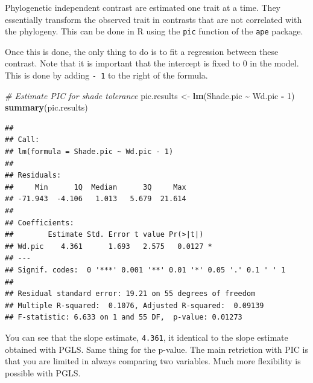 \documentclass[
]{book}
\newenvironment{Shaded}{\begin{snugshade}}{\end{snugshade}}
\newcommand{\AttributeTok}[1]{\textcolor[rgb]{0.13,0.29,0.53}{#1}}
\newcommand{\CommentTok}[1]{\textcolor[rgb]{0.56,0.35,0.01}{\textit{#1}}}
\newcommand{\DecValTok}[1]{\textcolor[rgb]{0.00,0.00,0.81}{#1}}
\newcommand{\FunctionTok}[1]{\textcolor[rgb]{0.13,0.29,0.53}{\textbf{#1}}}
\newcommand{\NormalTok}[1]{#1}
\newcommand{\OtherTok}[1]{\textcolor[rgb]{0.56,0.35,0.01}{#1}}
\newcommand{\SpecialCharTok}[1]{\textcolor[rgb]{0.81,0.36,0.00}{\textbf{#1}}}
\begin{document}
Phylogenetic independent contrast are estimated one trait at a time. They essentially transform the observed trait in contrasts that are not correlated with the phylogeny. This can be done in R using the \texttt{pic} function of the \texttt{ape} package.

\begin{Shaded}
\end{Shaded}

Once this is done, the only thing to do is to fit a regression between these contrast. Note that it is important that the intercept is fixed to 0 in the model. This is done by adding \texttt{-\ 1} to the right of the formula.

\begin{Shaded}
\begin{Highlighting}[]
\CommentTok{\# Estimate PIC for shade tolerance}
\NormalTok{pic.results }\OtherTok{\textless{}{-}} \FunctionTok{lm}\NormalTok{(Shade.pic }\SpecialCharTok{\textasciitilde{}}\NormalTok{ Wd.pic }\SpecialCharTok{{-}} \DecValTok{1}\NormalTok{)}
\FunctionTok{summary}\NormalTok{(pic.results)}
\end{Highlighting}
\end{Shaded}

\begin{verbatim}
## 
## Call:
## lm(formula = Shade.pic ~ Wd.pic - 1)
## 
## Residuals:
##     Min      1Q  Median      3Q     Max 
## -71.943  -4.106   1.013   5.679  21.614 
## 
## Coefficients:
##        Estimate Std. Error t value Pr(>|t|)  
## Wd.pic    4.361      1.693   2.575   0.0127 *
## ---
## Signif. codes:  0 '***' 0.001 '**' 0.01 '*' 0.05 '.' 0.1 ' ' 1
## 
## Residual standard error: 19.21 on 55 degrees of freedom
## Multiple R-squared:  0.1076, Adjusted R-squared:  0.09139 
## F-statistic: 6.633 on 1 and 55 DF,  p-value: 0.01273
\end{verbatim}

You can see that the slope estimate, \texttt{4.361}, it identical to the slope estimate obtained with PGLS. Same thing for the p-value. The main retriction with PIC is that you are limited in always comparing two variables. Much more flexibility is possible with PGLS.
\end{document}
